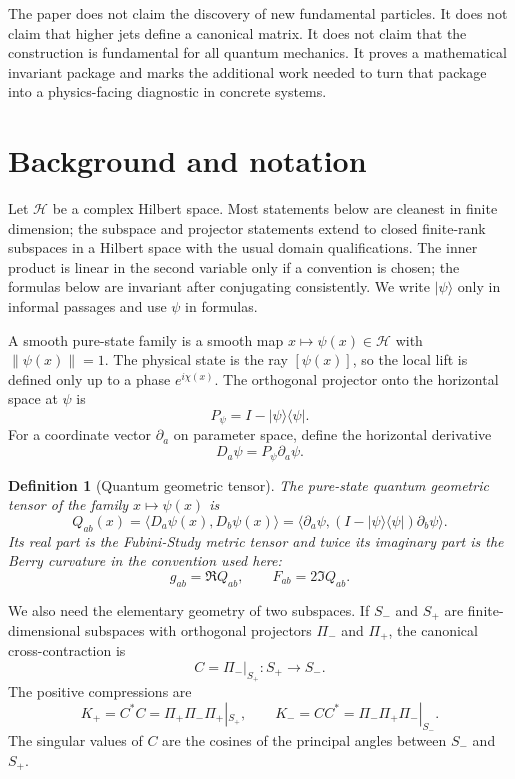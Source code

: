 \documentclass[11pt]{amsart}
\newtheorem{definition}[theorem]{Definition}
\newcommand{\Hilb}{\mathcal H}
\newcommand{\Id}{I}
\newcommand{\Proj}{\Pi}
\begin{document}
The paper does not claim the discovery of new fundamental particles. It does
not claim that higher jets define a canonical matrix. It does not claim that the
construction is fundamental for all quantum mechanics. It proves a mathematical
invariant package and marks the additional work needed to turn that package
into a physics-facing diagnostic in concrete systems.

\section{Background and notation}

Let \(\Hilb\) be a complex Hilbert space. Most statements below are cleanest in
finite dimension; the subspace and projector statements extend to closed
finite-rank subspaces in a Hilbert space with the usual domain qualifications.
The inner product is linear in the second variable only if a convention is
chosen; the formulas below are invariant after conjugating consistently. We
write \(|\psi\rangle\) only in informal passages and use \(\psi\) in formulas.

A smooth pure-state family is a smooth map \(x\mapsto \psi(x)\in \Hilb\) with
\(\|\psi(x)\|=1\). The physical state is the ray \([\psi(x)]\), so the local
lift is defined only up to a phase \(e^{i\chi(x)}\). The orthogonal projector
onto the horizontal space at \(\psi\) is
\[
        P_\psi=\Id-|\psi\rangle\langle \psi|.
\]
For a coordinate vector \(\partial_a\) on parameter space, define the horizontal
derivative
\[
        D_a\psi=P_\psi\partial_a\psi .
\]

\begin{definition}[Quantum geometric tensor]
The pure-state quantum geometric tensor of the family \(x\mapsto \psi(x)\) is
\[
        Q_{ab}(x)=\langle D_a\psi(x),D_b\psi(x)\rangle
        =\langle\partial_a\psi,
          (\Id-|\psi\rangle\langle\psi|)\partial_b\psi\rangle .
\]
Its real part is the Fubini-Study metric tensor and twice its imaginary part is
the Berry curvature in the convention used here:
\[
        g_{ab}=\Re Q_{ab},\qquad F_{ab}=2\Im Q_{ab}.
\]
\end{definition}

We also need the elementary geometry of two subspaces. If \(S_-\) and \(S_+\)
are finite-dimensional subspaces with orthogonal projectors \(\Proj_-\) and
\(\Proj_+\), the canonical cross-contraction is
\[
        C=\Proj_-|_{S_+}:S_+\to S_-.
\]
The positive compressions are
\[
        K_+=C^*C=\Proj_+\Proj_-\Proj_+|_{S_+},
        \qquad
        K_-=CC^*=\Proj_-\Proj_+\Proj_-|_{S_-}.
\]
The singular values of \(C\) are the cosines of the principal angles between
\(S_-\) and \(S_+\).
\end{document}
